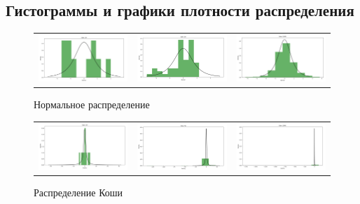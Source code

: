 \subsection{Гистограммы и графики плотности распределения}
	\begin{figure}[H]
		\centering
		\begin{tabular}{ccc}
			\includegraphics[width=55mm, height =0.25\textheight]{pics/n10.jpg}
			&
			\includegraphics[width=55mm, height =0.25\textheight]{pics/n50.jpg}
			&
			\includegraphics[width=55mm, height =0.25\textheight]{pics/n1000.jpg}
		\end{tabular}
		\caption{Нормальное распределение}
		\label{fig:normal}
	\end{figure}

	\begin{figure}[H]
		\centering
		\begin{tabular}{ccc}
			\includegraphics[width=55mm, height =0.25\textheight]{pics/c10.jpg}
			&
			\includegraphics[width=55mm, height =0.25\textheight]{pics/c50.jpg}
			&
			\includegraphics[width=55mm, height =0.25\textheight]{pics/c1000.jpg}
		\end{tabular}
		\caption{Распределение Коши}
		\label{fig:cauchy}
	\end{figure}
	


